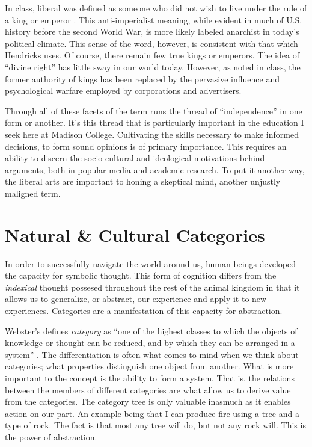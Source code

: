 \documentclass[12pt]{article}
\begin{document}
In class, liberal was defined as someone who did not wish to live under the rule
of a king or emperor \autocite{Matthews.2017}. This anti-imperialist meaning,
while evident in much of U.S. history before the second World War, is more
likely labeled anarchist in today's political climate. This sense of the word,
however, is consistent with that which Hendricks uses. Of course, there remain
few true kings or emperors. The idea of ``divine right'' has little sway in our
world today. However, as noted in class, the former authority of kings has been
replaced by the pervasive influence and psychological warfare employed by
corporations and advertisers.

Through all of these facets of the term runs the thread of ``independence'' in
one form or another. It's this thread that is particularly important in the
education I seek here at Madison College. Cultivating the skills necessary to
make informed decisions, to form sound opinions is of primary importance. This
requires an ability to discern the socio-cultural and ideological motivations
behind arguments, both in popular media and academic research. To put it another
way, the liberal arts are important to honing a skeptical mind, another unjustly
maligned term.

\section*{Natural \& Cultural Categories}

In order to successfully navigate the world around us, human beings developed
the capacity for symbolic thought. This form of cognition differs from the
\emph{indexical} thought possesed throughout the rest of the animal kingdom in that it
allows us to generalize, or abstract, our experience and apply it to new
experiences. Categories are a manifestation of this capacity for abstraction.

Webster's defines \emph{category} as ``one of the highest classes to which the
objects of knowledge or thought can be reduced, and by which they can be
arranged in a system'' \autocite{porter1913webster}. The differentiation is
often what comes to mind when we think about categories; what properties
distinguish one object from another. What is more important to the concept is
the ability to form a system. That is, the relations between the members of
different categories are what allow us to derive value from the categories. The
category tree is only valuable inasmuch as it enables action on our part. An
example being that I can produce fire using a tree and a type of rock. The fact
is that most any tree will do, but not any rock will. This is the power of
abstraction.
\end{document}
